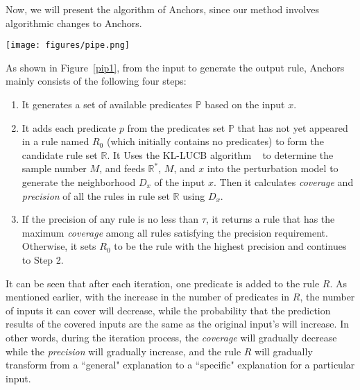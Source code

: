 Now, we will present the algorithm of Anchors, since our method involves algorithmic changes to Anchors.

\begin{figure*}[t]
\centering
\texttt{[image: figures/pipe.png]} 
\caption{The overall workflow of Anchors.}
\label{pip1}
\end{figure*}

As shown in Figure~\ref{pip1}, from the input to generate the output rule, Anchors mainly consists of the following four steps:

\begin{enumerate}
    \item It generates a set of available predicates $\mathbb{P}$ based on the input $x$.

    \item It adds each predicate $p$ from the predicates set $\mathbb{P}$ that has not yet appeared in a rule named $R_0$ (which initially contains no predicates) to form the candidate rule set $\mathbb{R}$. It Uses the KL-LUCB algorithm ~\cite{KL-LUCB} to determine the sample number $M$, and feeds $\mathbb{R^*}$, $M$, and $x$ into the perturbation model to generate the neighborhood $D_x$ of the input $x$. Then it calculates \emph{coverage} and \emph{precision} of all the rules in rule set $\mathbb{R}$ using $D_x$.

    \item If the precision of any rule is no less than $\tau$, it returns a rule that has the maximum \emph{coverage} among all rules satisfying the precision requirement. Otherwise, it sets $R_0$ to be the rule with the highest precision and continues to Step 2.


\end{enumerate}

It can be seen that after each iteration, one predicate is added to the rule $R$. As mentioned earlier, with the increase in the number of predicates in $R$, the number of inputs it can cover will decrease, while the probability that the prediction results of the covered inputs are the same as the original input's will increase. In other words, during the iteration process, the \emph{coverage} will gradually decrease while the \emph{precision} will gradually increase, and the rule $R$ will gradually transform from a ``general" explanation to a ``specific" explanation for a particular input.

